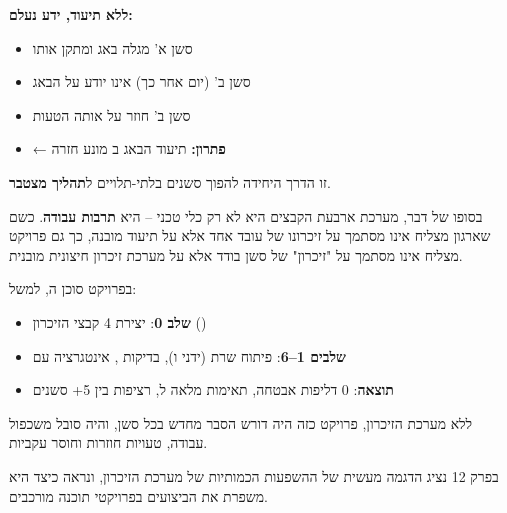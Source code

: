 \textbf{ללא תיעוד, ידע נעלם:}
\begin{itemize}
  \item סשן א' מגלה באג ומתקן אותו
  \item סשן ב' (יום אחר כך) אינו יודע על הבאג
  \item סשן ב' חוזר על אותה הטעות
  \item ← \textbf{פתרון:} תיעוד הבאג ב מונע חזרה
\end{itemize}

זו הדרך היחידה להפוך סשנים בלתי-תלויים ל\textbf{תהליך מצטבר}.


בסופו של דבר, מערכת ארבעת הקבצים היא לא רק כלי טכני – היא \textbf{תרבות עבודה}. כשם שארגון מצליח אינו מסתמך על זיכרונו של עובד אחד אלא על תיעוד מובנה, כך גם פרויקט  מצליח אינו מסתמך על "זיכרון" של סשן בודד אלא על מערכת זיכרון חיצונית מובנית.

בפרויקט סוכן ה, למשל:
\begin{itemize}
  \item \textbf{שלב \num{0}}: יצירת \num{4} קבצי הזיכרון ()
  \item \textbf{שלבים \num{1}–\num{6}}: פיתוח שרת  (ידני ו), בדיקות , אינטגרציה עם 
  \item \textbf{תוצאה}: \num{0} דליפות אבטחה, תאימות מלאה ל, רציפות בין \num{5}+ סשנים
\end{itemize}

ללא מערכת הזיכרון, פרויקט כזה היה דורש הסבר מחדש בכל סשן, והיה סובל משכפול עבודה, טעויות חוזרות וחוסר עקביות.

בפרק \num{12} נציג הדגמה מעשית של ההשפעות הכמותיות של מערכת הזיכרון, ונראה כיצד היא משפרת את הביצועים בפרויקטי תוכנה מורכבים.
